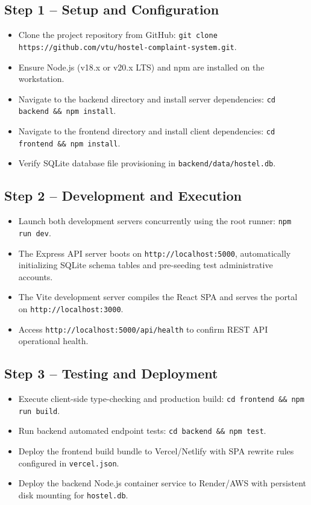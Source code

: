 \documentclass[10pt]{report}
\begin{document}
\subsection{Step 1 -- Setup and Configuration}
\begin{itemize}
\item Clone the project repository from GitHub: \texttt{git clone https://github.com/vtu/hostel-complaint-system.git}.
\item Ensure Node.js (v18.x or v20.x LTS) and npm are installed on the workstation.
\item Navigate to the backend directory and install server dependencies: \texttt{cd backend \&\& npm install}.
\item Navigate to the frontend directory and install client dependencies: \texttt{cd frontend \&\& npm install}.
\item Verify SQLite database file provisioning in \texttt{backend/data/hostel.db}.
\end{itemize}

\subsection{Step 2 -- Development and Execution}
\begin{itemize}
\item Launch both development servers concurrently using the root runner: \texttt{npm run dev}.
\item The Express API server boots on \texttt{http://localhost:5000}, automatically initializing SQLite schema tables and pre-seeding test administrative accounts.
\item The Vite development server compiles the React SPA and serves the portal on \texttt{http://localhost:3000}.
\item Access \texttt{http://localhost:5000/api/health} to confirm REST API operational health.
\end{itemize}

\subsection{Step 3 -- Testing and Deployment}
\begin{itemize}
\item Execute client-side type-checking and production build: \texttt{cd frontend \&\& npm run build}.
\item Run backend automated endpoint tests: \texttt{cd backend \&\& npm test}.
\item Deploy the frontend build bundle to Vercel/Netlify with SPA rewrite rules configured in \texttt{vercel.json}.
\item Deploy the backend Node.js container service to Render/AWS with persistent disk mounting for \texttt{hostel.db}.
\end{itemize}
\end{document}
